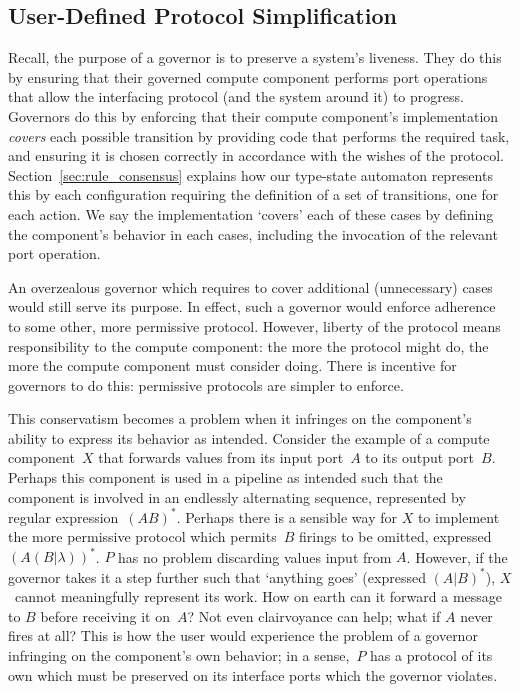 \subsection{User-Defined Protocol Simplification}
\label{sec:user_defined_simplification}
Recall, the purpose of a governor is to preserve a system's liveness.
They do this by ensuring that their governed compute component performs port operations that allow the interfacing protocol (and the system around it) to progress. 
Governors do this by enforcing that their compute component's implementation \textit{covers} each possible transition by providing code that performs the required task, and ensuring it is chosen correctly in accordance with the wishes of the protocol. Section~\ref{sec:rule_consensus} explains how our type-state automaton represents this by each configuration requiring the definition of a set of transitions, one for each action. We say the implementation `covers' each of these cases by defining the component's behavior in each cases, including the invocation of the relevant port operation.

An overzealous governor which requires to cover additional (unnecessary) cases would still serve its purpose. In effect, such a governor would enforce adherence to some other, more permissive protocol. However, liberty of the protocol means responsibility to the compute component: the more the protocol might do, the more the compute component must consider doing. There is incentive for governors to do this: permissive protocols are simpler to enforce.

This conservatism becomes a problem when it infringes on the component's ability to express its behavior as intended. Consider the example of a compute component~$X$ that forwards values from its input port~$A$ to its output port~$B$. Perhaps this component is used in a pipeline as intended such that the component is involved in an endlessly alternating sequence, represented by regular expression~$(AB)^*$. Perhaps there is a sensible way for $X$ to implement the more permissive protocol which permits~$B$ firings to be omitted, expressed $(A(B|\lambda{}))^*$. $P$ has no problem discarding values input from $A$. However, if the governor takes it a step further such that `anything goes' (expressed $(A|B)^*$), $X$~cannot meaningfully represent its work. How on earth can it forward a message to $B$ before receiving it on~$A$? Not even clairvoyance can help; what if $A$ never fires at all? This is how the user would experience the problem of a governor infringing on the component's own behavior; in a sense,~$P$ has a protocol of its own which must be preserved on its interface ports which the governor violates.



